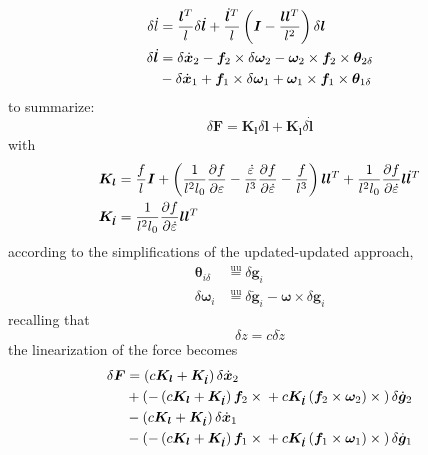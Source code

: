\documentclass[10pt,fleqn,subeqn]{report}
\newcommand{\T}[1]{\bm{#1}}
\newcommand{\equu}{\overset{\text{uu}}{=}}
\begin{document}
\begin{subequations}
\begin{align}
	\delta\dot{l} &= \frac{\T{l}^T}{l} \delta\dot{\T{l}}
		+ \frac{\dot{\T{l}}^T}{l}\plbr{\T{I} - \frac{\T{l}\T{l}^T}{l^2}} \delta\T{l} \\
	\delta\dot{\T{l}} &= \delta\dot{\T{x}}_2
		- \T{f}_2 \times \delta\T{\omega}_2 - \T{\omega}_2 \times \T{f}_2 \times \T{\theta}_{2\delta}
		\nonumber \\
		& \mbox{} - \delta\dot{\T{x}}_1
		+ \T{f}_1 \times \delta\T{\omega}_1 + \T{\omega}_1 \times \T{f}_1 \times \T{\theta}_{1\delta}
\end{align}
\end{subequations}
to summarize:
\begin{equation}
	\delta\T{F} = \T{K}_{\T{l}} \delta\T{l} + \T{K}_{\dot{\T{l}}} \delta\dot{\T{l}}
\end{equation}
with
\begin{subequations}
\begin{align}
	\T{K}_{\T{l}} &= \frac{f}{l} \T{I}
		+ \plbr{
			\frac{1}{l^2 l_0} \frac{\partial{f}}{\partial\varepsilon}
			- \frac{\dot{\varepsilon}}{l^3} \frac{\partial{f}}{\partial\dot{\varepsilon}}
			- \frac{f}{l^3}
		}\T{l}\T{l}^T
		+ \frac{1}{l^2 l_0} \frac{\partial{f}}{\partial\dot{\varepsilon}} \T{l}\dot{\T{l}}^T \\
	\T{K}_{\dot{\T{l}}} &= \frac{1}{l^2 l_0} \frac{\partial{f}}{\partial\dot{\varepsilon}} \T{l}\T{l}^T
\end{align}
\end{subequations}
according to the simplifications of the updated-updated approach,
\begin{subequations}
\begin{align}
	\T{\theta}_{i\delta} &\equu \delta\T{g}_i \\
	\delta\T{\omega}_i &\equu \delta\dot{\T{g}}_i - \T{\omega}\times\delta\T{g}_i
\end{align}
\end{subequations}
recalling that
\begin{equation}
	\delta{z} = c \delta\dot{z}
\end{equation}
the linearization of the force becomes
\begin{align}
	\delta\T{F} &= \plbr{c\T{K}_{\T{l}} + \T{K}_{\dot{\T{l}}}} \delta\dot{\T{x}}_2
		\nonumber \\
		& + \plbr{
			- \plbr{c\T{K}_{\T{l}} + \T{K}_{\dot{\T{l}}}} \T{f}_2\times{}
			+ c \T{K}_{\dot{\T{l}}} \plbr{\T{f}_2 \times \T{\omega}_2}\times{}
		} \delta\dot{\T{g}}_2
		\nonumber \\
		& - \plbr{c\T{K}_{\T{l}} + \T{K}_{\dot{\T{l}}}} \delta\dot{\T{x}}_1
		\nonumber \\
		& - \plbr{
			- \plbr{c\T{K}_{\T{l}} + \T{K}_{\dot{\T{l}}}} \T{f}_1\times{}
			+ c \T{K}_{\dot{\T{l}}} \plbr{\T{f}_1 \times \T{\omega}_1}\times{}
		} \delta\dot{\T{g}}_1
\end{align}
\end{document}
